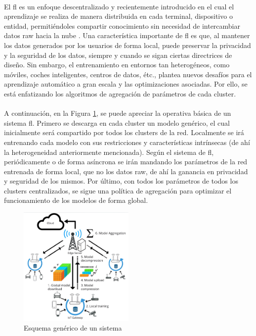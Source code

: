 \\
El \gls{fl} es un enfoque descentralizado y recientemente introducido en el cual el aprendizaje se realiza de manera distribuida en cada terminal, dispositivo o entidad, permitiéndoles compartir conocimiento sin necesidad de intercambiar datos raw hacia la nube \cite{mcmahan2017communication}. Una característica importante de \gls{fl} es que, al mantener los datos generados por los usuarios de forma local, puede preservar la privacidad y la seguridad de los datos, siempre y cuando se sigan ciertas directrices de diseño. Sin embargo, el entrenamiento en entornos tan heterogéneos, como móviles, coches inteligentes, centros de datos, étc., plantea nuevos desafíos para el aprendizaje automático a gran escala y las optimizaciones asociadas. Por ello, se está enfatizando los algoritmos de agregación de parámetros de cada cluster.\\
\\
A continuación, en la Figura \ref{fig:fl}, se puede apreciar la operativa básica de un sistema \gls{fl}. Primero se descarga en cada cluster un modelo genérico, el cual inicialmente será compartido por todos los clusters de la red. Localmente se irá entrenando cada modelo con sus restricciones y características intrínsecas (de ahí la heterogeneidad anteriormente mencionada). Según el sistema de \gls{fl}, periódicamente o de forma asíncrona se irán mandando los parámetros de la red entrenada de forma local, que no los datos raw, de ahí la ganancia en privacidad y seguridad de los mismos. Por último, con todos los parámetros de todos los clusters centralizados, se sigue una política de agregación para optimizar el funcionamiento de los modelos de forma global.\\

\begin{figure}[h!]
    \centering
    \includegraphics[width=0.5\textwidth]{archivos/img/teoria/fl.jpg}
    \caption{Esquema genérico de un sistema  \cite{mills2019communication}}
    \label{fig:fl}
\end{figure}


